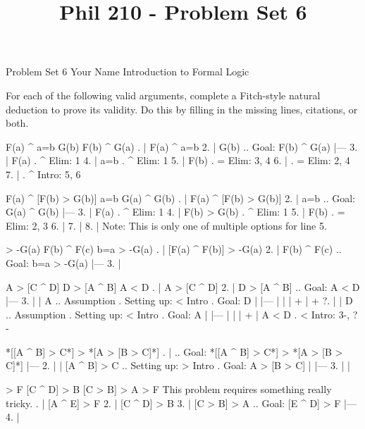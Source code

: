 
\title{Phil 210 - Problem Set 6}

\heading
Problem Set 6
Your Name
Introduction to Formal Logic
\endheading

For each of the following valid arguments, complete a Fitch-style natural deduction to prove its validity. Do this by filling in the missing lines, citations, or both.

\problems
{}
\argument
 F(a) ^ a=b
 G(b)
\argumentline
 F(b) ^ G(a)
\endargument
        \answer
        . | F(a) ^ a=b
         2. | G(b)         ..  Goal: F(b) ^ G(a)
            |---
         3. | F(a)         .  ^ Elim: 1
         4. | a=b          .  ^ Elim: 1
         5. | F(b)         .  = Elim: 3, 4
         6. |              .  = Elim: 2, 4
         7. |              .  ^ Intro: 5, 6
        \endfitchproof
        \endanswer

\argument
 F(a) ^ [F(b) > G(b)]
 a=b
\argumentline
 G(a) ^ G(b)
\endargument
        \answer
        . | F(a) ^ [F(b) > G(b)]
         2. | a=b          ..  Goal: G(a) ^ G(b)
            |---
         3. | F(a)         .  ^ Elim: 1
         4. | F(b) > G(b)  .  ^ Elim: 1
         5. | F(b)         .  = Elim: 2, 3
         6. | 
         7. | 
         8. | 
        \endfitchproof
        \endanswer
Note: This is only one of multiple options for line 5.

\argument
 [F(a) ^ F(b)] > -G(a)
 F(b) ^ F(c)
\argumentline
 b=a > -G(a)
\endargument
        \answer
        . | [F(a) ^ F(b)] > -G(a)
         2. | F(b) ^ F(c)    ..  Goal: b=a > -G(a)
            |---
         3. | 
        \endfitchproof
        \endanswer

\argument
 A > [C ^ D]
 D > [A ^ B]
\argumentline
 A < D
\endargument
        \answer
        . | A > [C ^ D]
         2. | D > [A ^ B]  ..  Goal: A < D
            |---
         3. |   | A        ..  Assumption  .  Setting up: < Intro  .  Goal: D
            |   |---
            |   | 
            |   +
            |   +
         ?. |   | D        ..  Assumption  .  Setting up: < Intro  .  Goal: A
            |   |---
            |   | 
            |   +
            | A < D        .  < Intro: 3-, ?-
        \endfitchproof
        \endanswer

\argument
\argumentline
 *[[A ^ B] > C*] > *[A > [B > C]*]
\endargument
        \answer
        . |                    ..  Goal: *[[A ^ B] > C*] > *[A > [B > C]*]
            |---
         2. |   | [A ^ B] > C    ..  Setting up: > Intro  .  Goal: A > [B > C]
            |   |---
         3. |   | 
        \endfitchproof
        \endanswer

\argument
 [A ^ E] > F
 [C ^ D] > B
 [C > B] > A
\argumentline
 [E ^ D] > F
\endargument
\Hint This problem requires something really tricky.
        \answer
        . | [A ^ E] > F
         2. | [C ^ D] > B
         3. | [C > B] > A  ..  Goal: [E ^ D] > F
            |---
         4. | 
        \endfitchproof
        \endanswer

\endproblems
\bye
